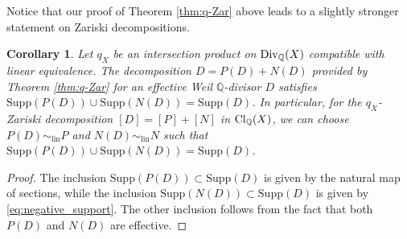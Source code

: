 \documentclass[12pt,reqno]{amsart}
\def\Q{{\mathbb Q}}
\def\Cl{\mathop{\rm Cl}\nolimits}
\def\Div{\mathop{\rm Div}\nolimits}
\newtheorem{cor}[thm]{Corollary}
\theoremstyle{plain}
\theoremstyle{definition}
\begin{document}
 Notice that our proof of Theorem \ref{thm:q-Zar}  above leads to a slightly stronger statement on Zariski decompositions.
\begin{cor} Let $q_X$ be an intersection product on $\Div_{\Q}(X)$ compatible with linear equivalence.  The decomposition  $D= P(D) + N(D)$ provided by Theorem \ref{thm:q-Zar} for an effective Weil $\Q$-divisor $D$  satisfies $\mathrm{Supp} (P(D))\cup \mathrm{Supp} (N(D))=\mathrm{Supp} (D)$. In particular, for the $q_X$-Zariski decomposition $[D]=[P]+[N] $ in $\Cl_{\Q}(X)$, we can choose $P(D)\sim_{\mathrm{lin}} P$ and  $N(D)\sim_{\mathrm{lin}} N$ such that $\mathrm{Supp} (P(D))\cup \mathrm{Supp} (N(D))=\mathrm{Supp} (D)$.
\end{cor}
\begin{proof}
The inclusion $\mathrm{Supp} (P(D))\subset \mathrm{Supp}(D)$ is given by the natural map of sections, while the inclusion $\mathrm{Supp} (N(D))\subset \mathrm{Supp}(D)$ is given by \eqref{eq:negative_support}. The other inclusion follows from the fact that both $P(D)$ and $N(D)$ are effective.
\end{proof}
\end{document}
